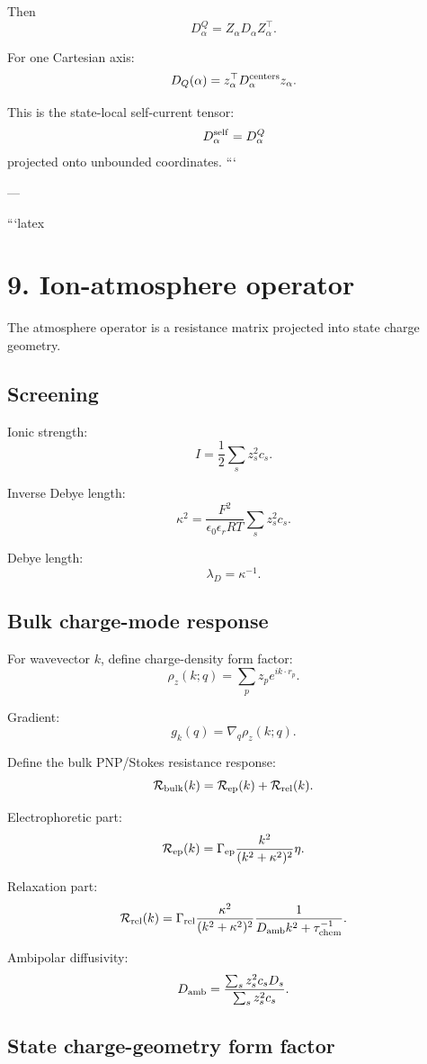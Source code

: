 Then
\[
D_\alpha^{Q}
=
Z_\alpha D_\alpha Z_\alpha^\top.
\]

For one Cartesian axis:
\[
D_Q(\alpha)=z_\alpha^\top D_\alpha^{\rm centers}z_\alpha.
\]

This is the state-local self-current tensor:
\[
D_\alpha^{\rm self}=D_\alpha^Q
\]
projected onto unbounded coordinates.
```

---

```latex
\section{9. Ion-atmosphere operator}

The atmosphere operator is a resistance matrix projected into state charge geometry.

\subsection{Screening}

Ionic strength:
\[
I=\frac12\sum_s z_s^2 c_s.
\]

Inverse Debye length:
\[
\kappa^2
=
\frac{F^2}{\epsilon_0\epsilon_r RT}
\sum_s z_s^2 c_s.
\]

Debye length:
\[
\lambda_D=\kappa^{-1}.
\]

\subsection{Bulk charge-mode response}

For wavevector \(k\), define charge-density form factor:
\[
\rho_z(k;q)=\sum_p z_p e^{ik\cdot r_p}.
\]

Gradient:
\[
g_k(q)=\nabla_q\rho_z(k;q).
\]

Define the bulk PNP/Stokes resistance response:
\[
\mathcal R_{\rm bulk}(k)
=
\mathcal R_{\rm ep}(k)+\mathcal R_{\rm rel}(k).
\]

Electrophoretic part:
\[
\mathcal R_{\rm ep}(k)
=
\Gamma_{\rm ep}
\frac{k^2}{(k^2+\kappa^2)^2}
\eta.
\]

Relaxation part:
\[
\mathcal R_{\rm rel}(k)
=
\Gamma_{\rm rel}
\frac{\kappa^2}{(k^2+\kappa^2)^2}
\frac{1}{D_{\rm amb}k^2+\tau_{\rm chem}^{-1}}.
\]

Ambipolar diffusivity:
\[
D_{\rm amb}
=
\frac{\sum_s z_s^2c_sD_s}{\sum_s z_s^2c_s}.
\]

\subsection{State charge-geometry form factor}

